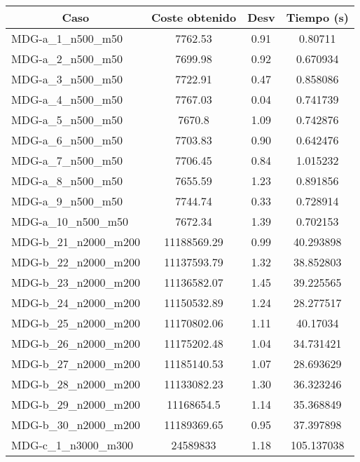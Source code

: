 \documentclass[10pt,a4paper]{article}
\begin{document}
\begin{table}[H]
	\begin{center}
		\begin{tabular}{|l|c|c|c|} 
			\hline
			\multicolumn{1}{|c|}{\textbf{Caso}} & \textbf{Coste obtenido} & \textbf{Desv} & \textbf{Tiempo (s)} \\ \hline
			\hline
					MDG-a\_1\_n500\_m50 & 7762.53 & 0.91 & 0.80711 \\ \hline
					MDG-a\_2\_n500\_m50 & 7699.98 & 0.92 & 0.670934 \\ \hline
					MDG-a\_3\_n500\_m50 & 7722.91 & 0.47 & 0.858086 \\ \hline
					MDG-a\_4\_n500\_m50 & 7767.03 & 0.04 & 0.741739 \\ \hline
					MDG-a\_5\_n500\_m50 & 7670.8 & 1.09 & 0.742876 \\ \hline
					MDG-a\_6\_n500\_m50 & 7703.83 & 0.90 & 0.642476 \\ \hline
					MDG-a\_7\_n500\_m50 & 7706.45 & 0.84 & 1.015232 \\ \hline
					MDG-a\_8\_n500\_m50 & 7655.59 & 1.23 & 0.891856 \\ \hline
					MDG-a\_9\_n500\_m50 & 7744.74 & 0.33 & 0.728914 \\ \hline
					MDG-a\_10\_n500\_m50 & 7672.34 & 1.39 & 0.702153 \\ \hline
					MDG-b\_21\_n2000\_m200 & 11188569.29 & 0.99 & 40.293898 \\ \hline
					MDG-b\_22\_n2000\_m200 & 11137593.79 & 1.32 & 38.852803 \\ \hline
					MDG-b\_23\_n2000\_m200 & 11136582.07 & 1.45 & 39.225565 \\ \hline
					MDG-b\_24\_n2000\_m200 & 11150532.89 & 1.24 & 28.277517 \\ \hline
					MDG-b\_25\_n2000\_m200 & 11170802.06 & 1.11 & 40.17034 \\ \hline
					MDG-b\_26\_n2000\_m200 & 11175202.48 & 1.04 & 34.731421 \\ \hline
					MDG-b\_27\_n2000\_m200 & 11185140.53 & 1.07 & 28.693629 \\ \hline
					MDG-b\_28\_n2000\_m200 & 11133082.23 & 1.30 & 36.323246 \\ \hline
					MDG-b\_29\_n2000\_m200 & 11168654.5 & 1.14 & 35.368849 \\ \hline
					MDG-b\_30\_n2000\_m200 & 11189369.65 & 0.95 & 37.397898 \\ \hline
					MDG-c\_1\_n3000\_m300 & 24589833 & 1.18 & 105.137038 \\ \hline

\end{tabular}
\end{center}
\end{table}
\end{document}
